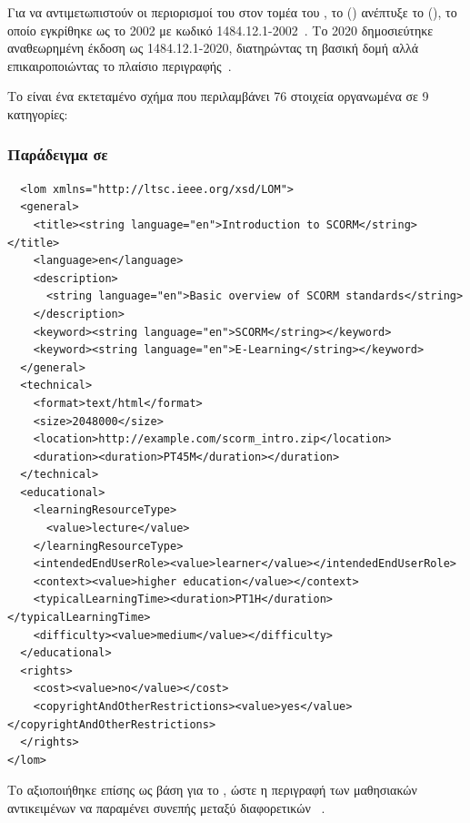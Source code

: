 Για να αντιμετωπιστούν οι περιορισμοί του   στον τομέα του , το      () ανέπτυξε το     (), το οποίο εγκρίθηκε ως  το 2002 με κωδικό  1484.12.1-2002~\cite{ieee2002lom_standard,ieee2002lom,wiki_lom}.
Το 2020 δημοσιεύτηκε αναθεωρημένη έκδοση ως  1484.12.1-2020, διατηρώντας τη βασική δομή αλλά επικαιροποιώντας το πλαίσιο περιγραφής~\cite{ieee2020lom}.

Το   είναι ένα εκτεταμένο σχήμα  που περιλαμβάνει 76 στοιχεία οργανωμένα σε 9 κατηγορίες:



\subsubsection{Παράδειγμα   σε }

{\selectfont

\begin{verbatim}
  <lom xmlns="http://ltsc.ieee.org/xsd/LOM">
  <general>
    <title><string language="en">Introduction to SCORM</string></title>
    <language>en</language>
    <description>
      <string language="en">Basic overview of SCORM standards</string>
    </description>
    <keyword><string language="en">SCORM</string></keyword>
    <keyword><string language="en">E-Learning</string></keyword>
  </general>
  <technical>
    <format>text/html</format>
    <size>2048000</size>
    <location>http://example.com/scorm_intro.zip</location>
    <duration><duration>PT45M</duration></duration>
  </technical>
  <educational>
    <learningResourceType>
      <value>lecture</value>
    </learningResourceType>
    <intendedEndUserRole><value>learner</value></intendedEndUserRole>
    <context><value>higher education</value></context>
    <typicalLearningTime><duration>PT1H</duration></typicalLearningTime>
    <difficulty><value>medium</value></difficulty>
  </educational>
  <rights>
    <cost><value>no</value></cost>
    <copyrightAndOtherRestrictions><value>yes</value></copyrightAndOtherRestrictions>
  </rights>
</lom>
\end{verbatim}
}


Το  αξιοποιήθηκε επίσης ως βάση για το  , ώστε η περιγραφή των μαθησιακών αντικειμένων να παραμένει συνεπής μεταξύ διαφορετικών ~\cite{osu2024metadata}.

